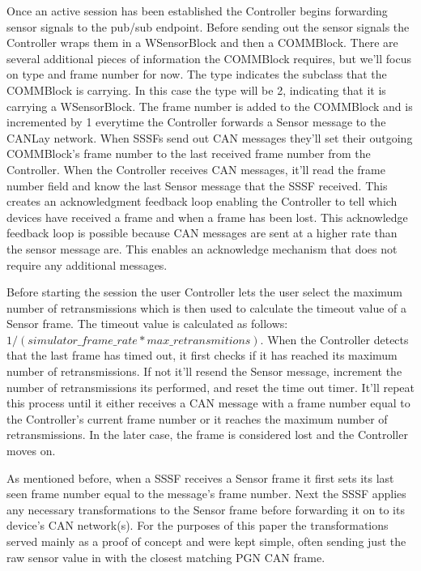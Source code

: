 \documentclass[letterpaper,twocolumn,10pt]{article}
\begin{document}
Once an active session has been established the Controller begins forwarding sensor signals to the pub/sub endpoint. Before sending out the sensor signals the Controller wraps them in a WSensorBlock and then a COMMBlock. There are several additional pieces of information the COMMBlock requires, but we'll focus on type and frame number for now. The type indicates the subclass that the COMMBlock is carrying. In this case the type will be 2, indicating that it is carrying a WSensorBlock. The frame number is added to the COMMBlock and is incremented by 1 everytime the Controller forwards a Sensor message to the CANLay network. When SSSFs send out CAN messages they’ll set their outgoing COMMBlock's frame number to the last received frame number from the Controller. When the Controller receives CAN messages, it'll read the frame number field and know the last Sensor message that the SSSF received. This creates an acknowledgment feedback loop enabling the Controller to tell which devices have received a frame and when a frame has been lost. This acknowledge feedback loop is possible because CAN messages are sent at a higher rate than the sensor message are. This enables an acknowledge mechanism that does not require any additional messages.

Before starting the session the user Controller lets the user select the maximum number of retransmissions which is then used to calculate the timeout value of a Sensor frame. The timeout value is calculated as follows: $1/(simulator\_frame\_rate * max\_retransmitions)$. When the Controller detects that the last frame has timed out, it first checks if it has reached its maximum number of retransmissions. If not it'll resend the Sensor message, increment the number of retransmissions its performed, and reset the time out timer. It’ll repeat this process until it either receives a CAN message with a frame number equal to the Controller's current frame number or it reaches the maximum number of retransmissions. In the later case, the frame is considered lost and the Controller moves on.

As mentioned before, when a SSSF receives a Sensor frame it first sets its last seen frame number equal to the message's frame number. Next the SSSF applies any necessary transformations to the Sensor frame before forwarding it on to its device's CAN network(s). For the purposes of this paper the transformations served mainly as a proof of concept and were kept simple, often sending just the raw sensor value in with the closest matching PGN CAN frame.
\end{document}
